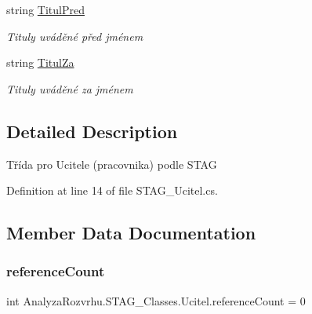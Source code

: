 \begin{DoxyCompactItemize}
string \hyperlink{class_analyza_rozvrhu_1_1_s_t_a_g___classes_1_1_ucitel_a4f38f721cfefb4c8d7f2eb795ada4467}{Titul\+Pred}
\begin{DoxyCompactList}\small\item\em Tituly uváděné před jménem \end{DoxyCompactList}\item 
string \hyperlink{class_analyza_rozvrhu_1_1_s_t_a_g___classes_1_1_ucitel_a9f57e6cfe43b55f9d78a961c4dcb9490}{Titul\+Za}
\begin{DoxyCompactList}\small\item\em Tituly uváděné za jménem \end{DoxyCompactList}\end{DoxyCompactItemize}


\subsection{Detailed Description}
Třída pro Ucitele (pracovnika) podle S\+T\+AG 



Definition at line 14 of file S\+T\+A\+G\+\_\+\+Ucitel.\+cs.



\subsection{Member Data Documentation}
\mbox{\label{class_analyza_rozvrhu_1_1_s_t_a_g___classes_1_1_ucitel_a44ca8b9f8a4fd37309d622bb52012012}} 
\subsubsection{\texorpdfstring{reference\+Count}{referenceCount}}
{\footnotesize\ttfamily int Analyza\+Rozvrhu.\+S\+T\+A\+G\+\_\+\+Classes.\+Ucitel.\+reference\+Count = 0}



